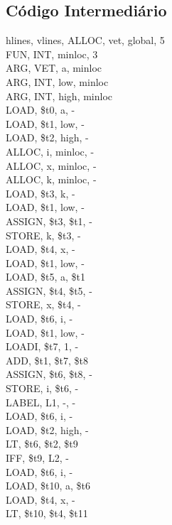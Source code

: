 \documentclass[
	12pt,				%
	oneside,
	a4paper,			%
	english,			%
	french,				%
	spanish,			%
	brazil,				%
	]{abntex2}
\begin{document}
\subsection{Código Intermediário}


\begin{longtblr}[
  caption = {Código Intermediário},
  label = {tab: ResultadosSortIntermediario},
]{
  hlines,
  vlines,
}
ALLOC, vet, global, 5\\
FUN, INT, minloc, 3\\
ARG, VET, a, minloc\\
ARG, INT, low, minloc\\
ARG, INT, high, minloc\\
LOAD, \$t0, a, -\\
LOAD, \$t1, low, -\\
LOAD, \$t2, high, -\\
ALLOC, i, minloc, -\\
ALLOC, x, minloc, -\\
ALLOC, k, minloc, -\\
LOAD, \$t3, k, -\\
LOAD, \$t1, low, -\\
ASSIGN, \$t3, \$t1, -\\
STORE, k, \$t3, -\\
LOAD, \$t4, x, -\\
LOAD, \$t1, low, -\\
LOAD, \$t5, a, \$t1\\
ASSIGN, \$t4, \$t5, -\\
STORE, x, \$t4, -\\
LOAD, \$t6, i, -\\
LOAD, \$t1, low, -\\
LOADI, \$t7, 1, -\\
ADD, \$t1, \$t7, \$t8\\
ASSIGN, \$t6, \$t8, -\\
STORE, i, \$t6, -\\
LABEL, L1, -, -\\
LOAD, \$t6, i, -\\
LOAD, \$t2, high, -\\
LT, \$t6, \$t2, \$t9\\
IFF, \$t9, L2, -\\
LOAD, \$t6, i, -\\
LOAD, \$t10, a, \$t6\\
LOAD, \$t4, x, -\\
LT, \$t10, \$t4, \$t11\\

\end{longtblr}
\end{document}
